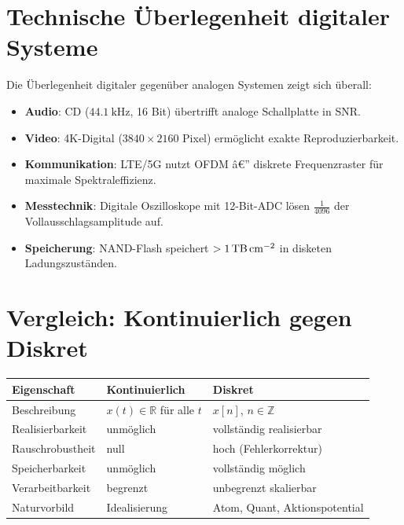﻿\documentclass[12pt,a4paper,titlepage]{report}
\begin{document}
\section{Technische Überlegenheit digitaler Systeme}

Die Überlegenheit digitaler gegenüber analogen Systemen zeigt sich überall:

\begin{itemize}[leftmargin=2em]
	\item \textbf{Audio}: CD ($\SI{44.1}{\kilo\hertz}$, 16 Bit) übertrifft analoge Schallplatte in SNR.
	\item \textbf{Video}: 4K-Digital ($3840 \times 2160$ Pixel) ermöglicht exakte Reproduzierbarkeit.
	\item \textbf{Kommunikation}: LTE/5G nutzt OFDM â€” diskrete Frequenzraster für 
		maximale Spektraleffizienz.
	\item \textbf{Messtechnik}: Digitale Oszilloskope mit 12-Bit-ADC lösen 
		$\frac{1}{4096}$ der Vollausschlagsamplitude auf.
	\item \textbf{Speicherung}: NAND-Flash speichert $> \SI{1}{\tera\byte\per\centi\meter\squared}$ 
		in disketen Ladungszuständen.
\end{itemize}

\section{Vergleich: Kontinuierlich gegen Diskret}

\begin{center}
\begin{tabular}{lll}
\toprule
\textbf{Eigenschaft} & \textbf{Kontinuierlich} & \textbf{Diskret} \\
\midrule
Beschreibung & $x(t) \in \mathbb{R}$ für alle $t$ & $x[n]$, $n \in \mathbb{Z}$ \\
Realisierbarkeit & unmöglich & vollständig realisierbar \\
Rauschrobustheit & null & hoch (Fehlerkorrektur) \\
Speicherbarkeit & unmöglich & vollständig möglich \\
Verarbeitbarkeit & begrenzt & unbegrenzt skalierbar \\
Naturvorbild & Idealisierung & Atom, Quant, Aktionspotential \\
\bottomrule
\end{tabular}
\end{center}

\end{document}
